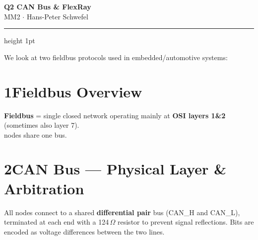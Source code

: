 \documentclass[10pt,a4paper]{article}
\begin{document}

\begin{center}
  {\large\bfseries\color{headernavy} Q2 \textemdash{} CAN Bus \& FlexRay}\\[1pt]
  {\small MM2 $\cdot$ Hans-Peter Schwefel}
\end{center}
\vspace{1pt}\hrule height 1pt\vspace{5pt}

We look at two fieldbus protocols used in embedded/automotive systems:
\section*{1\quad Fieldbus Overview}

\begin{keybox}
\textbf{Fieldbus} = single closed network operating mainly at \textbf{OSI layers 1\&2}
(sometimes also layer 7). \\ nodes share one bus.
\end{keybox}

\section*{2\quad CAN Bus --- Physical Layer \& Arbitration}
All nodes connect to a shared \textbf{differential pair} bus (CAN\_H and CAN\_L), terminated at each end with a 124\,$\Omega$ resistor to prevent signal reflections. Bits are encoded as voltage differences between the two lines.
\end{document}
